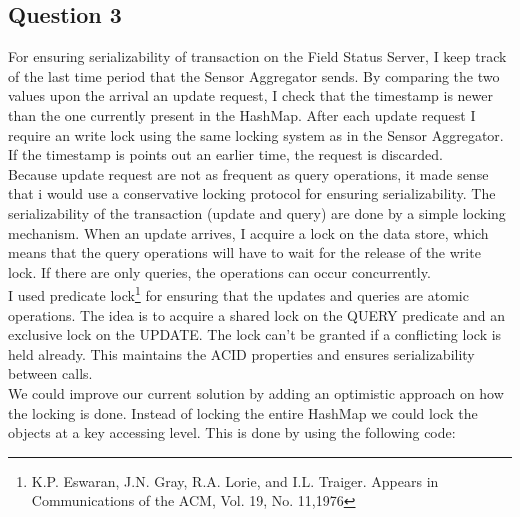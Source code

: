 \documentclass{article}      %
\begin{document}
\subsection* {Question 3}

For ensuring serializability of transaction on the Field Status Server, I keep track of the last time period that the Sensor Aggregator sends. By comparing the two values upon the arrival an update request, I check that the timestamp is newer than the one currently present in the HashMap. After each update request I require an write lock using the same locking system as in the Sensor Aggregator. If the timestamp is points out an earlier time, the request is discarded. \\

Because update request are not as frequent as query operations, it made sense that i would use a conservative locking protocol for ensuring serializability. 
The serializability of the transaction (update and query) are done by a simple locking mechanism. When an update arrives, I acquire a lock on the data store, which means that the query operations will have to wait for the release of the write lock. If there are only queries, the operations can occur concurrently.\\

I used predicate lock\footnote{K.P. Eswaran, J.N. Gray, R.A. Lorie, and I.L. Traiger.
Appears in Communications of the ACM, Vol. 19, No. 11,1976} for ensuring that the updates and queries are atomic operations.  The idea is to acquire a shared lock on the QUERY predicate and an exclusive lock on the UPDATE. The lock can't be granted if a conflicting lock is held already. This maintains the ACID properties and ensures serializability between calls.\\

We could improve our current solution by adding an optimistic approach on how the locking is done. Instead of locking the entire HashMap we could lock the objects at a key accessing level. This is done by using the following code: 
\end{document}
